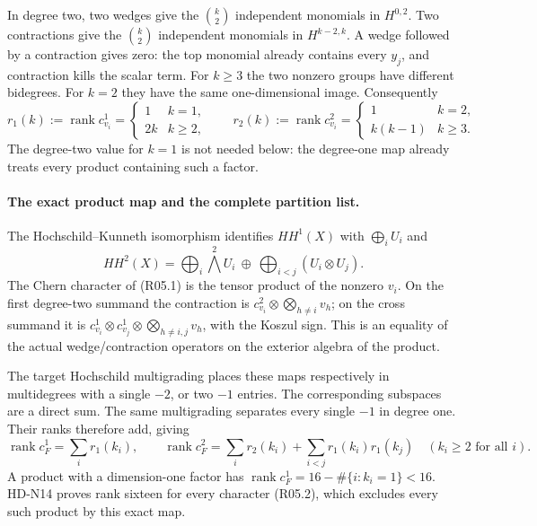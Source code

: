 In degree two, two wedges give the $\binom{k}{2}$ independent
monomials in $H^{0,2}$. Two contractions give the
$\binom{k}{2}$ independent monomials in $H^{k-2,k}$.
A wedge followed by a contraction gives zero: the top monomial already
contains every $y_j$, and contraction kills the scalar term.
For $k\ge3$ the two nonzero groups have different bidegrees.
For $k=2$ they have the same one-dimensional image. Consequently
\[
 r_1(k):=\operatorname{rank}c_{v_i}^1=
 \begin{cases}1&k=1,\\2k&k\ge2,\end{cases}
 \qquad
 r_2(k):=\operatorname{rank}c_{v_i}^2=
 \begin{cases}1&k=2,\\k(k-1)&k\ge3.\end{cases}             \tag{R05.3}
\]
The degree-two value for $k=1$ is not needed below: the degree-one
map already treats every product containing such a factor.

\paragraph{The exact product map and the complete partition list.}
The Hochschild--Kunneth isomorphism identifies $HH^1(X)$ with
$\bigoplus_iU_i$ and
\[
 HH^2(X)=\bigoplus_i\bigwedge^2U_i
                  \ \oplus\ \bigoplus_{i<j}(U_i\otimes U_j).
                                                               \tag{R05.4}
\]
The Chern character of (R05.1) is the tensor product of the nonzero
$v_i$. On the first degree-two summand the contraction is
$c_{v_i}^2\otimes\bigotimes_{h\ne i}v_h$; on the cross summand
it is $c_{v_i}^1\otimes c_{v_j}^1\otimes
\bigotimes_{h\ne i,j}v_h$, with the Koszul sign. This is an equality
of the actual wedge/contraction operators on the exterior algebra of
the product.

The target Hochschild multigrading places these maps respectively in
multidegrees with a single $-2$, or two $-1$ entries. The corresponding
subspaces are a direct sum. The same multigrading separates every
single $-1$ in degree one. Their ranks therefore add, giving
\[
 \operatorname{rank}c_F^1=\sum_i r_1(k_i),\qquad
 \operatorname{rank}c_F^2=
       \sum_i r_2(k_i)+\sum_{i<j}r_1(k_i)r_1(k_j)
       \quad(k_i\ge2\text{ for all }i).                       \tag{R05.5}
\]
A product with a dimension-one factor has
$\operatorname{rank}c_F^1=16-\#\{i:k_i=1\}<16$.
HD-N14 proves rank sixteen for every character (R05.2), which
excludes every such product by this exact map.

